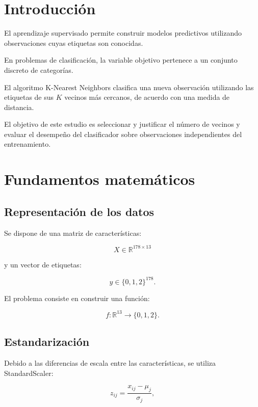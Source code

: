 ﻿\documentclass[11pt,a4paper]{article}
\begin{document}
\section{Introducción}

El aprendizaje supervisado permite construir modelos
predictivos utilizando observaciones cuyas etiquetas
son conocidas.

En problemas de clasificación, la variable objetivo
pertenece a un conjunto discreto de categorías.

El algoritmo K-Nearest Neighbors clasifica una nueva
observación utilizando las etiquetas de sus
$K$ vecinos más cercanos, de acuerdo con una
medida de distancia.

El objetivo de este estudio es seleccionar y
justificar el número de vecinos y evaluar el
desempeño del clasificador sobre observaciones
independientes del entrenamiento.

\section{Fundamentos matemáticos}

\subsection{Representación de los datos}

Se dispone de una matriz de características:

\begin{equation}
X \in \mathbb{R}^{178 \times 13}
\end{equation}

y un vector de etiquetas:

\begin{equation}
y \in \{0,1,2\}^{178}.
\end{equation}

El problema consiste en construir una función:

\begin{equation}
f:\mathbb{R}^{13}\rightarrow\{0,1,2\}.
\end{equation}

\subsection{Estandarización}

Debido a las diferencias de escala entre las
características, se utiliza StandardScaler:

\begin{equation}
z_{ij}=\frac{x_{ij}-\mu_j}{\sigma_j},
\end{equation}
\end{document}
